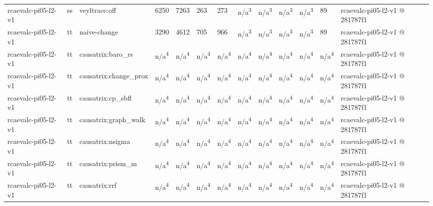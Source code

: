 \begin{table}[t]
\begin{tabular}{lllllllllllll}
rcaevalc-pi05-l2-v1 & ss & veyltrace:off & 6250 & 7263 & 263 & 273 & n/a\textsuperscript{3} & n/a\textsuperscript{3} & n/a\textsuperscript{3} & n/a\textsuperscript{3} & 89 & rcaevalc-pi05-l2-v1 @ 281787f1 \\
rcaevalc-pi05-l2-v1 & tt & naive-change & 3290 & 4612 & 705 & 966 & n/a\textsuperscript{3} & n/a\textsuperscript{3} & n/a\textsuperscript{3} & n/a\textsuperscript{3} & 89 & rcaevalc-pi05-l2-v1 @ 281787f1 \\
rcaevalc-pi05-l2-v1 & tt & causatrix:baro\_rs & n/a\textsuperscript{4} & n/a\textsuperscript{4} & n/a\textsuperscript{4} & n/a\textsuperscript{4} & n/a\textsuperscript{4} & n/a\textsuperscript{4} & n/a\textsuperscript{4} & n/a\textsuperscript{4} & n/a\textsuperscript{4} & rcaevalc-pi05-l2-v1 @ 281787f1 \\
rcaevalc-pi05-l2-v1 & tt & causatrix:change\_prox & n/a\textsuperscript{4} & n/a\textsuperscript{4} & n/a\textsuperscript{4} & n/a\textsuperscript{4} & n/a\textsuperscript{4} & n/a\textsuperscript{4} & n/a\textsuperscript{4} & n/a\textsuperscript{4} & n/a\textsuperscript{4} & rcaevalc-pi05-l2-v1 @ 281787f1 \\
rcaevalc-pi05-l2-v1 & tt & causatrix:cp\_sbfl & n/a\textsuperscript{4} & n/a\textsuperscript{4} & n/a\textsuperscript{4} & n/a\textsuperscript{4} & n/a\textsuperscript{4} & n/a\textsuperscript{4} & n/a\textsuperscript{4} & n/a\textsuperscript{4} & n/a\textsuperscript{4} & rcaevalc-pi05-l2-v1 @ 281787f1 \\
rcaevalc-pi05-l2-v1 & tt & causatrix:graph\_walk & n/a\textsuperscript{4} & n/a\textsuperscript{4} & n/a\textsuperscript{4} & n/a\textsuperscript{4} & n/a\textsuperscript{4} & n/a\textsuperscript{4} & n/a\textsuperscript{4} & n/a\textsuperscript{4} & n/a\textsuperscript{4} & rcaevalc-pi05-l2-v1 @ 281787f1 \\
rcaevalc-pi05-l2-v1 & tt & causatrix:nsigma & n/a\textsuperscript{4} & n/a\textsuperscript{4} & n/a\textsuperscript{4} & n/a\textsuperscript{4} & n/a\textsuperscript{4} & n/a\textsuperscript{4} & n/a\textsuperscript{4} & n/a\textsuperscript{4} & n/a\textsuperscript{4} & rcaevalc-pi05-l2-v1 @ 281787f1 \\
rcaevalc-pi05-l2-v1 & tt & causatrix:prism\_m & n/a\textsuperscript{4} & n/a\textsuperscript{4} & n/a\textsuperscript{4} & n/a\textsuperscript{4} & n/a\textsuperscript{4} & n/a\textsuperscript{4} & n/a\textsuperscript{4} & n/a\textsuperscript{4} & n/a\textsuperscript{4} & rcaevalc-pi05-l2-v1 @ 281787f1 \\
rcaevalc-pi05-l2-v1 & tt & causatrix:rrf & n/a\textsuperscript{4} & n/a\textsuperscript{4} & n/a\textsuperscript{4} & n/a\textsuperscript{4} & n/a\textsuperscript{4} & n/a\textsuperscript{4} & n/a\textsuperscript{4} & n/a\textsuperscript{4} & n/a\textsuperscript{4} & rcaevalc-pi05-l2-v1 @ 281787f1 \\

\end{tabular}
\end{table}
